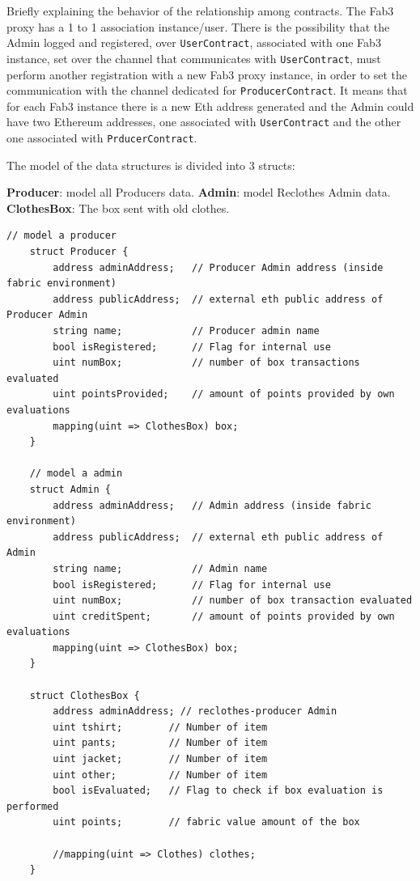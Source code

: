 Briefly explaining the behavior of the relationship among contracts. The Fab3 proxy has a 1 to 1 association 
instance/user. There is the possibility that the Admin logged and registered, over \texttt{UserContract}, associated 
with one Fab3 instance, set over the channel that communicates with \texttt{UserContract}, must perform another 
registration with a new Fab3 proxy instance, in order to set the communication with the channel dedicated for 
\texttt{ProducerContract}. It means that for each Fab3 instance there is a new Eth address generated and the Admin 
could have two Ethereum addresses, one associated with \texttt{UserContract} and the other one associated with 
\texttt{PrducerContract}.
\bigskip


The model of the data structures is divided into 3 structs:

\begin{outline}[enumerate]
    \1 \textbf{Producer}: model all Producers data.
    \1 \textbf{Admin}: model Reclothes Admin data.
    \1 \textbf{ClothesBox}: The box sent with old clothes.
\end{outline}

\begin{lstlisting}[language=Solidity]
    // model a producer
    struct Producer {
        address adminAddress;   // Producer Admin address (inside fabric environment)
        address publicAddress;  // external eth public address of Producer Admin
        string name;            // Producer admin name
        bool isRegistered;      // Flag for internal use
        uint numBox;            // number of box transactions evaluated
        uint pointsProvided;    // amount of points provided by own evaluations
        mapping(uint => ClothesBox) box;
    }

    // model a admin
    struct Admin {
        address adminAddress;   // Admin address (inside fabric environment)
        address publicAddress;  // external eth public address of Admin
        string name;            // Admin name
        bool isRegistered;      // Flag for internal use
        uint numBox;            // number of box transaction evaluated
        uint creditSpent;       // amount of points provided by own evaluations
        mapping(uint => ClothesBox) box;
    }

    struct ClothesBox {
        address adminAddress; // reclothes-producer Admin
        uint tshirt;        // Number of item
        uint pants;         // Number of item
        uint jacket;        // Number of item
        uint other;         // Number of item
        bool isEvaluated;   // Flag to check if box evaluation is performed
        uint points;        // fabric value amount of the box

        //mapping(uint => Clothes) clothes;
    }
\end{lstlisting}

